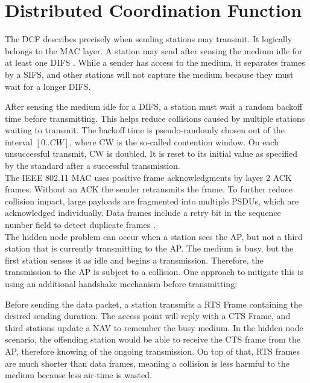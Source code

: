 
\section{Distributed Coordination Function}\label{sec:dcf}

The \gls{DCF} describes precisely when sending stations may transmit. It logically belongs to the \gls{MAC} layer. A station may send after sensing the medium idle for at least one \gls{DIFS} \cite{bianchi2000}. While a sender has access to the medium, it separates frames by a \gls{SIFS}, and other stations will not capture the medium because they must wait for a longer \gls{DIFS}.

After sensing the medium idle for a \gls{DIFS}, a station must wait a random backoff time before transmitting. This helps reduce collisions caused by multiple stations waiting to transmit. The backoff time is pseudo-randomly chosen out of the interval $[0..CW]$, where CW is the so-called contention window. On each unsuccessful transmit, CW is doubled. It is reset to its initial value as specified by the standard after a successful transmission.\\

The \gls{IEEE} 802.11 \gls{MAC} uses positive frame acknowledgments by layer 2 \gls{ACK} frames. Without an \gls{ACK} the sender retransmits the frame. To further reduce collision impact, large payloads are fragmented into multiple \glspl{PSDU}, which are acknowledged individually. Data frames include a retry bit in the sequence number field to detect duplicate frames \cite{perahia2013}.\\

The hidden node problem can occur when a station sees the \gls{AP}, but not a third station that is currently transmitting to the \gls{AP}. The medium is busy, but the first station senses it as idle and begins a transmission. Therefore, the transmission to the \gls{AP} is subject to a collision. One approach to mitigate this is using an additional handshake mechanism before transmitting:

Before sending the data packet, a station transmits a \gls{RTS} Frame containing the desired sending duration. The access point will reply with a \gls{CTS} Frame, and third stations update a \gls{NAV} to remember the busy medium. In the hidden node scenario, the offending station would be able to receive the \gls{CTS} frame from the \gls{AP}, therefore knowing of the ongoing transmission. On top of that, \gls{RTS} frames are much shorter than data frames, meaning a collision is less harmful to the medium because less air-time is wasted.



